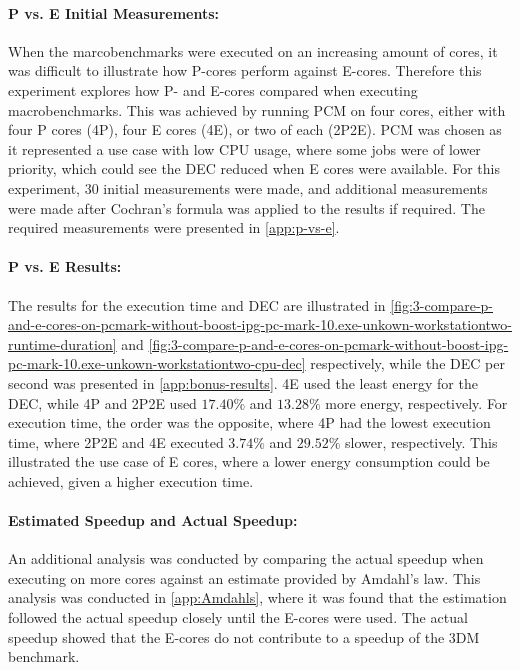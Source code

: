 

\paragraph{P vs. E Initial Measurements:} When the marcobenchmarks were executed on an increasing amount of cores, it was difficult to illustrate how P-cores perform against E-cores. Therefore this experiment explores how P- and E-cores compared when executing macrobenchmarks. This was achieved by running PCM on four cores, either with four P cores (4P), four E cores (4E), or two of each (2P2E). PCM was chosen as it represented a use case with low CPU usage, where some jobs were of lower priority, which could see the DEC reduced when E cores were available. For this experiment, $30$ initial measurements were made, and additional measurements were made after Cochran's formula was applied to the results if required. The required measurements were presented in \cref{app:p-vs-e}.



\paragraph{P vs. E Results:} The results for the execution time and DEC are illustrated in \cref{fig:3-compare-p-and-e-cores-on-pcmark-without-boost-ipg-pc-mark-10.exe-unkown-workstationtwo-runtime-duration} and  \cref{fig:3-compare-p-and-e-cores-on-pcmark-without-boost-ipg-pc-mark-10.exe-unkown-workstationtwo-cpu-dec} respectively, while the DEC per second was presented in \cref{app:bonus-results}. 4E used the least energy for the DEC, while 4P and 2P2E used $17.40\%$ and $13.28\%$ more energy, respectively. For execution time, the order was the opposite, where 4P had the lowest execution time, where 2P2E and 4E executed $3.74\%$ and $29.52\%$ slower, respectively. This illustrated the use case of E cores, where a lower energy consumption could be achieved, given a higher execution time.  


\paragraph{Estimated Speedup and Actual Speedup:}
An additional analysis was conducted by comparing the actual speedup when executing on more cores against an estimate provided by Amdahl's law. This analysis was conducted in \cref{app:Amdahls}, where it was found that the estimation followed the actual speedup closely until the E-cores were used. The actual speedup showed that the E-cores do not contribute to a speedup of the 3DM benchmark.


